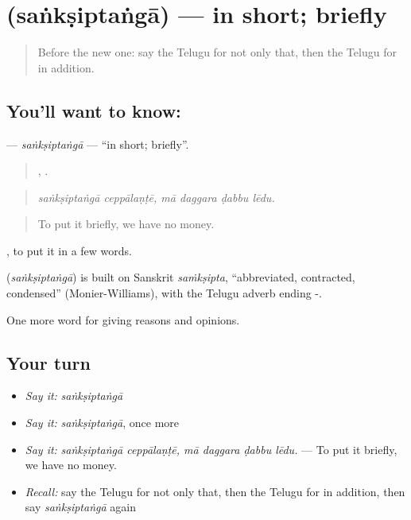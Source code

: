 \section[\texorpdfstring{\te{సంక్షిప్తంగా} (saṅkṣiptaṅgā)}{సంక్షిప్తంగా (saṅkṣiptaṅgā)}]{ (saṅkṣiptaṅgā) — in short; briefly}

\label{lesson:TE-C397-sanksiptanga}



\begin{quote}
Before the new one: say the Telugu for not only that, then the Telugu for in addition.
\end{quote}

\subsection*{You'll want to know: }
\textbf{} — \emph{saṅkṣiptaṅgā} — \textquotedblleft{}in short; briefly\textquotedblright{}.

\begin{quote}
 ,    .
\end{quote}

\begin{quote}
\emph{saṅkṣiptaṅgā ceppālaṇṭē, mā daggara ḍabbu lēdu.}
\end{quote}

\begin{quote}
To put it briefly, we have no money.
\end{quote}

 , to put it in a few words.

\begin{cousinweb}
\textbf{} (\emph{saṅkṣiptaṅgā}) is built on Sanskrit \emph{saṁkṣipta}, \textquotedblleft{}abbreviated, contracted, condensed\textquotedblright{} (Monier-Williams), with the Telugu adverb ending -.
\end{cousinweb}

\begin{grammarlens}[title={What you've built}]
One more word for giving reasons and opinions.
\end{grammarlens}

\subsection*{Your turn}
\begin{itemize}
\raggedright
  \item \emph{Say it:} \emph{saṅkṣiptaṅgā}
  \item \emph{Say it:} \emph{saṅkṣiptaṅgā}, once more
  \item \emph{Say it:} \emph{saṅkṣiptaṅgā ceppālaṇṭē, mā daggara ḍabbu lēdu.} — To put it briefly, we have no money.
  \item \emph{Recall:} say the Telugu for not only that, then the Telugu for in addition, then say \emph{saṅkṣiptaṅgā} again
\end{itemize}

